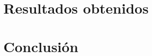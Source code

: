 \documentclass[10pt,letterpaper,openany]{article}
\begin{document}
    \section{Resultados obtenidos}
        

    \section{Conclusión}
        

    \newpage
    
    
    \newpage
      
    
\end{document}
